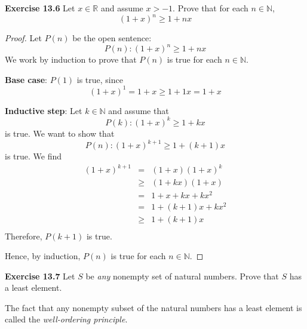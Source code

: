 \documentclass[12pt,oneside]{article}
\newenvironment{exercise}[1]{\vspace{.1in}\noindent\textbf{Exercise #1 \hspace{.05em}}}{}
\newcommand{\R}{\mathbb{R}}
\newcommand{\N}{\mathbb{N}}
\begin{document}

\begin{exercise}{13.6}
Let $x \in \R$ and assume $x > -1$. Prove that for each $n \in \N$,
\[(1 + x)^n \geq 1 + nx\]
\end{exercise}

\begin{proof}
Let $P(n)$ be the open sentence:
\[P(n): (1 + x)^n \geq 1 + nx\]
We work by induction to prove that $P(n)$ is true for each $n \in \N$.

\textbf{Base case}: $P(1)$ is true, since
\[(1+x)^1 = 1 + x \geq 1 + 1x = 1 + x \]

\textbf{Inductive step}: Let $k \in \N$ and assume that
\[P(k): (1 + x)^k \geq 1 + kx\]
is true. We want to show that
\[P(n): (1 + x)^{k+1} \geq 1 + (k+1)x\]
is true. We find
\begin{eqnarray*}
(1+x)^{k+1} &=& (1+x)(1+x)^k \\
&\geq& (1+kx)(1+x) \\
&=& 1+x+kx+kx^2 \\
&=& 1+(k+1)x+kx^2 \\
&\geq& 1+(k+1)x \\
\end{eqnarray*}
Therefore, $P(k+1)$ is true.

Hence, by induction, $P(n)$ is true for each $n \in \N$.

\end{proof}



\begin{exercise}{13.7}
Let $S$ be \textit{any} nonempty set of natural numbers. Prove that $S$ has a least element.

The fact that any nonempty subset of the natural numbers has a least element is called the \textit{well-ordering principle}.
\end{exercise}
\end{document}
